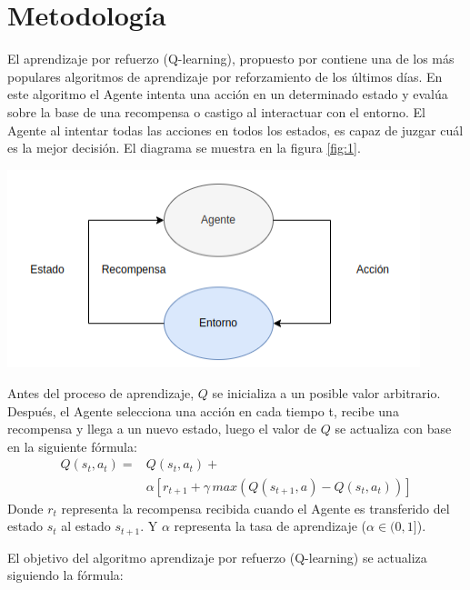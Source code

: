 \documentclass[letterpaper, 10 pt]{article}
\newenvironment{Figura}
{\par\medskip\noindent\minipage{\linewidth}}
{\endminipage\par\medskip}
\begin{document}
\section{Metodología}

El aprendizaje por refuerzo (Q-learning), propuesto por \cite{watkins1992q} contiene una de los más populares algoritmos de aprendizaje por reforzamiento de los últimos días. En este algoritmo el Agente intenta una acción en un determinado estado y evalúa sobre la base de una recompensa o castigo al interactuar con el entorno. El Agente al intentar todas las acciones en todos los estados, es capaz de juzgar cuál es la mejor decisión. El diagrama se muestra en la figura \ref{fig:1}.

\begin{Figura}
	\centering
	\includegraphics[width=0.9\textwidth]{diagrama.png}
	\label{fig:1}
\end{Figura}   

Antes del proceso de aprendizaje, $Q$ se inicializa a un posible valor arbitrario. Después, el Agente selecciona una acción en cada tiempo t, recibe una recompensa y llega a un nuevo estado, luego el valor de $Q$ se actualiza con base en la siguiente fórmula:
\begin{equation}
	\begin{split}
		\displaystyle	Q(s_t,a_t)  = &Q(s_t,a_t) + \\ & \alpha[r_{t+1} + \gamma \, max(Q(s_{t+1},a) - Q(s_t,a_t) )] \label{eq:1}
	\end{split}
\end{equation}
Donde $r_t$ representa la recompensa recibida cuando el Agente es transferido del estado $s_{t}$ al estado $s_{t+1}$. Y $\alpha$ representa la tasa de aprendizaje ($\alpha \in (0,1]$).

El objetivo del algoritmo aprendizaje por refuerzo (Q-learning) se actualiza siguiendo la fórmula:
\end{document}
